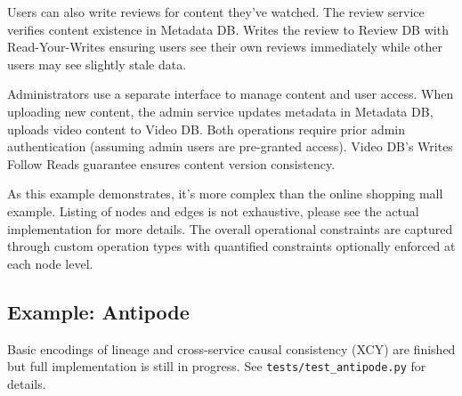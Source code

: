 Users can also write reviews for content they've watched. The review service
verifies content existence in Metadata DB. Writes the review to Review DB with
Read-Your-Writes ensuring users see their own reviews immediately while other
users may see slightly stale data.

Administrators use a separate interface to manage content and user access. When
uploading new content, the admin service updates metadata in Metadata DB,
uploads video content to Video DB. Both operations require prior admin
authentication (assuming admin users are pre-granted access). Video DB's Writes
Follow Reads guarantee ensures content version consistency.

As this example demonstrates, it's more complex than the online shopping mall
example. Listing of nodes and edges is not exhaustive, please see the actual
implementation for more details. The overall operational constraints are
captured through custom operation types with quantified constraints optionally
enforced at each node level.


\subsection{Example: Antipode \cite{ferreira2023antipode}}

Basic encodings of lineage and cross-service causal consistency (XCY) are
finished but full implementation is still in progress. See
\texttt{tests/test\_antipode.py} for
details.
